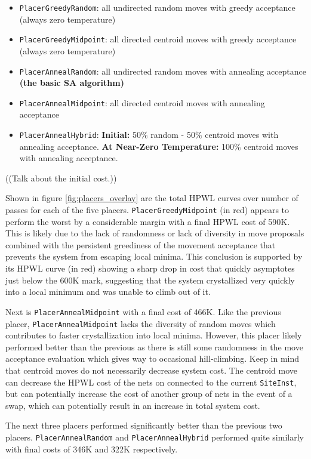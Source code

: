 \begin{itemize}
    \item \texttt{PlacerGreedyRandom}: all undirected random moves with greedy acceptance (always zero temperature)
    \item \texttt{PlacerGreedyMidpoint}: all directed centroid moves with greedy acceptance (always zero temperature)
    \item \texttt{PlacerAnnealRandom}: all undirected random moves with annealing acceptance \textbf{(the basic SA algorithm)}
    \item \texttt{PlacerAnnealMidpoint}: all directed centroid moves with annealing acceptance
    \item \texttt{PlacerAnnealHybrid}: \textbf{Initial:} 50\% random - 50\% centroid moves with annealing acceptance. \textbf{At Near-Zero Temperature:} 100\% centroid moves with annealing acceptance.
\end{itemize}

((Talk about the initial cost.))

Shown in figure \ref{fig:placers_overlay} are the total HPWL curves over number of passes for each of the five placers. 
\texttt{PlacerGreedyMidpoint} (in red) appears to perform the worst by a considerable margin with a final HPWL cost of 590K.
This is likely due to the lack of randomness or lack of diversity in move proposals combined with the persistent greediness of the movement acceptance that prevents the system from escaping local minima.
This conclusion is supported by its HPWL curve (in red) showing a sharp drop in cost that quickly asymptotes just below the 600K mark, suggesting that the system crystallized very quickly into a local minimum and was unable to climb out of it.

Next is \texttt{PlacerAnnealMidpoint} with a final cost of 466K.
Like the previous placer, \texttt{PlacerAnnealMidpoint} lacks the diversity of random moves which contributes to faster crystallization into local minima.
However, this placer likely performed better than the previous as there is still some randomness in the move acceptance evaluation which gives way to occasional hill-climbing. 
Keep in mind that centroid moves do not necessarily decrease system cost. 
The centroid move can decrease the HPWL cost of the nets on connected to the current \texttt{SiteInst}, but can potentially increase the cost of another group of nets in the event of a swap, which can potentially result in an increase in total system cost.

The next three placers performed significantly better than the previous two placers.
\texttt{PlacerAnnealRandom} and \texttt{PlacerAnnealHybrid} performed quite similarly with final costs of 346K and 322K respectively. 

